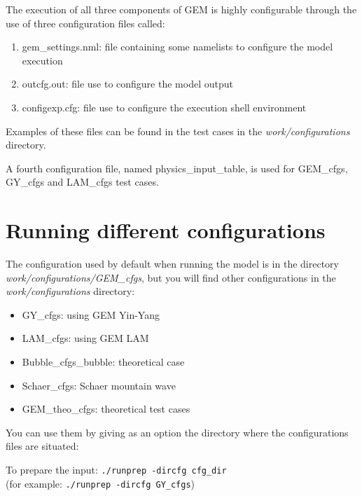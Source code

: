 \documentclass[11pt]{book}
\begin{document}
The execution of all three components of GEM is highly configurable through
the use of three configuration files called:

\begin{enumerate} 
\item gem\_settings.nml: file containing some namelists to configure the model execution
\item outcfg.out: 	file use to configure the model output
\item configexp.cfg: 	file use to configure the execution shell environment
\end{enumerate} 

Examples of these files can be found in the test cases in the
\textit{work/configurations} directory.


A fourth configuration file, named physics\_input\_table, is used for GEM\_cfgs,
GY\_cfgs and LAM\_cfgs test cases.

\section{Running different configurations}

The configuration used by default when running the model is in the directory
\textit{work/configurations/GEM\_cfgs}, but you will find other configurations in the
\textit{work/configurations} directory:

\begin{itemize}
\item GY\_cfgs: using GEM Yin-Yang
\item LAM\_cfgs: using GEM LAM
\item Bubble\_cfgs\_bubble: theoretical case %
\item Schaer\_cfgs: Schaer mountain wave
\item GEM\_theo\_cfgs: theoretical test cases%
\end{itemize} 

You can use them by giving as an option the directory where the
configurations files are situated:

To prepare the input: \texttt{./runprep -dircfg cfg\_dir}\\
(for example:  \texttt{./runprep -dircfg GY\_cfgs})
\end{document}
